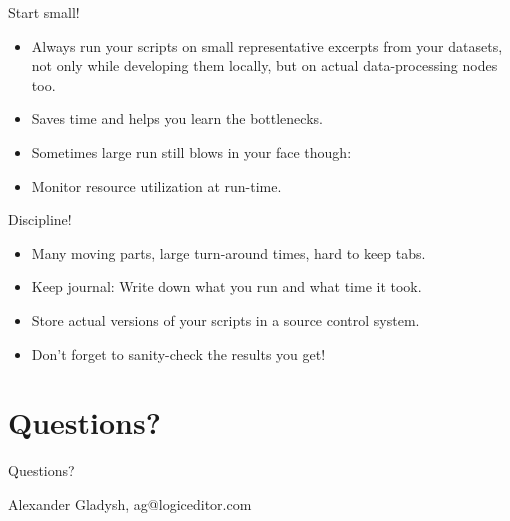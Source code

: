 \documentclass[handout]{beamer}
\begin{document}

\begin{frame}{Start small!}

\begin{itemize}
\item Always run your scripts on small representative excerpts
      from your datasets, not only while developing them locally,
      but on actual data-processing nodes too.
\item Saves time and helps you learn the bottlenecks.
\item Sometimes large run still blows in your face though:
\item Monitor resource utilization at run-time.
\end{itemize}

\end{frame}


\begin{frame}{Discipline!}

\begin{itemize}
\item Many moving parts, large turn-around times, hard to keep tabs.
\item Keep journal: Write down what you run and what time it took.
\item Store actual versions of your scripts in a source control system.
\item Don't forget to sanity-check the results you get!
\end{itemize}

\end{frame}


\section{Questions?}


\begin{frame}{Questions?}

Alexander Gladysh,
ag@logiceditor.com

\end{frame}

\end{document}
